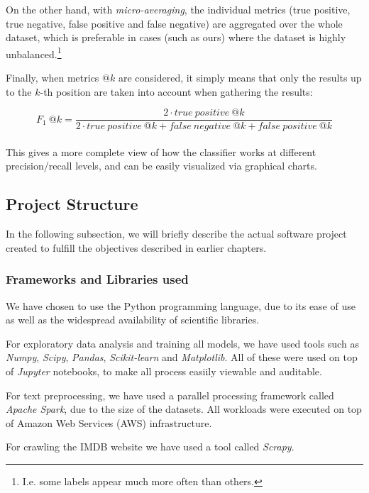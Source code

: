 On the other hand, with \textit{micro-averaging}, the individual metrics (true positive, true negative, false positive and false negative) are aggregated over the whole dataset, which is preferable in cases (such as ours) where the dataset is highly unbalanced.\footnote{I.e. some labels appear much more often than others.}  

Finally, when metrics $@k$ are considered, it simply means that only the results up to the $k$-th position are taken into account when gathering the results:

\begin{equation}
F_1\ @k = \frac{2 \cdot true \ positive\ @k}{2 \cdot true \ positive\ @k + false \ negative\ @k + false \ positive\ @k} 
\end{equation}\\

This gives a more complete view of how the classifier works at different precision/recall levels, and can be easily visualized via graphical charts.

\subsection{Project Structure}

In the following subsection, we will briefly describe the actual software project created to fulfill the objectives described in earlier chapters.

\subsubsection{Frameworks and Libraries used}

We have chosen to use the Python programming language, due to its ease of use as well as the widespread availability of scientific libraries.

For exploratory data analysis and training all models, we have used tools such as \textit{Numpy}, \textit{Scipy}, \textit{Pandas}, \textit{Scikit-learn} and \textit{Matplotlib}. All of these were used on top of \textit{Jupyter} notebooks, to make all process easiily viewable and auditable.

For text preprocessing, we have used a parallel processing framework called \textit{Apache Spark}, due to the size of the datasets. All workloads were executed on top of Amazon Web Services (AWS) infrastructure.

For crawling the IMDB website we have used a tool called \textit{Scrapy}.

